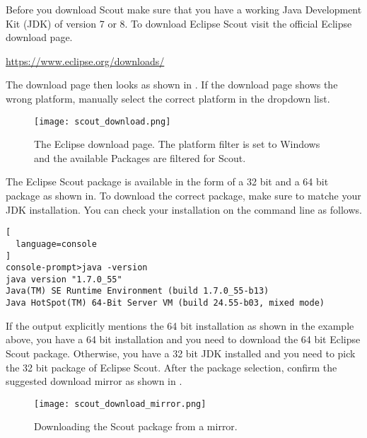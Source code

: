 %

Before you download Scout make sure that you have a working Java Development Kit (JDK) of version 7 or 8.
To download Eclipse Scout visit the official Eclipse download page.

\url{https://www.eclipse.org/downloads/}

The download page then looks as shown in .
If the download page shows the wrong platform, manually select the correct platform in the dropdown list.

\begin{figure}
\texttt{[image: scout\_download.png]}
\caption{The Eclipse download page. The platform filter is set to Windows and the available Packages are filtered for Scout.}
\end{figure}

The Eclipse Scout package is available in the form of a 32 bit and a 64 bit package as shown in. 
To download the correct package, make sure to matche your JDK installation. 
You can check your installation on the command line as follows.

\begin{lstlisting}[
  language=console
]
console-prompt>java -version
java version "1.7.0_55"
Java(TM) SE Runtime Environment (build 1.7.0_55-b13)
Java HotSpot(TM) 64-Bit Server VM (build 24.55-b03, mixed mode)
\end{lstlisting}

If the output explicitly mentions the 64 bit installation as shown in the example above, you have a 64 bit installation and you need to download the 64 bit Eclipse Scout package. 
Otherwise, you have a 32 bit JDK installed and you need to pick the 32 bit package of Eclipse Scout.
After the package selection, confirm the suggested download mirror as shown in .

\begin{figure}
\texttt{[image: scout\_download\_mirror.png]}
\caption{Downloading the Scout package from a mirror.}
\end{figure}

